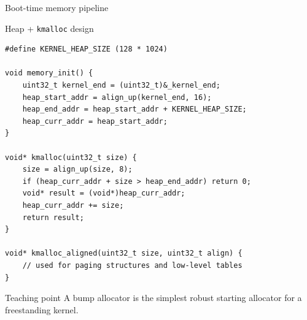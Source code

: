 \documentclass[aspectratio=169]{beamer}
\newcommand{\concept}[2]{%
  \begin{block}{#1}\smallskip #2\smallskip\end{block}\vspace{5pt}}
\begin{document}
\begin{frame}{Boot-time memory pipeline}
\begin{center}
\end{center}
\end{frame}

\begin{frame}[fragile]{Heap + \texttt{kmalloc} design}
\begin{lstlisting}[style=clang]
#define KERNEL_HEAP_SIZE (128 * 1024)

void memory_init() {
    uint32_t kernel_end = (uint32_t)&_kernel_end;
    heap_start_addr = align_up(kernel_end, 16);
    heap_end_addr = heap_start_addr + KERNEL_HEAP_SIZE;
    heap_curr_addr = heap_start_addr;
}

void* kmalloc(uint32_t size) {
    size = align_up(size, 8);
    if (heap_curr_addr + size > heap_end_addr) return 0;
    void* result = (void*)heap_curr_addr;
    heap_curr_addr += size;
    return result;
}

void* kmalloc_aligned(uint32_t size, uint32_t align) {
    // used for paging structures and low-level tables
}
\end{lstlisting}
\concept{Teaching point}{
  A bump allocator is the simplest robust starting allocator for a freestanding kernel.
}
\end{frame}
\end{document}
